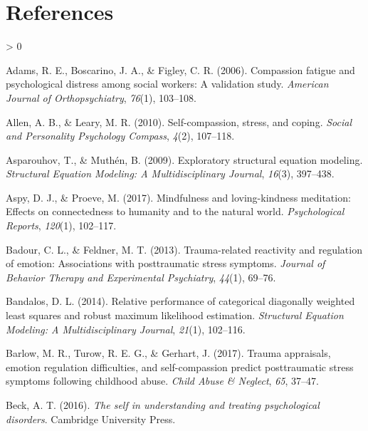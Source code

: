 \documentclass[
  english,
  man,floatsintext]{apa7}
\newlength{\cslhangindent}
\newenvironment{CSLReferences}[2] %
 {%
  \setlength{\parindent}{0pt}
  \ifodd #1 \everypar{\setlength{\hangindent}{\cslhangindent}}\ignorespaces\fi
  \ifnum #2 > 0
  \setlength{\parskip}{#2\baselineskip}
  \fi
 }%
 {}
\begin{document}
\newpage

\hypertarget{references}{%
\section{References}\label{references}}

\begingroup
\setlength{\parindent}{-0.5in}
\setlength{\leftskip}{0.5in}

\hypertarget{refs}{}
\begin{CSLReferences}{1}{0}
\leavevmode\hypertarget{ref-adams2006compassion}{}%
Adams, R. E., Boscarino, J. A., \& Figley, C. R. (2006). Compassion fatigue and psychological distress among social workers: A validation study. \emph{American Journal of Orthopsychiatry}, \emph{76}(1), 103--108.

\leavevmode\hypertarget{ref-allen2010self}{}%
Allen, A. B., \& Leary, M. R. (2010). Self-compassion, stress, and coping. \emph{Social and Personality Psychology Compass}, \emph{4}(2), 107--118.

\leavevmode\hypertarget{ref-asparouhov2009exploratory}{}%
Asparouhov, T., \& Muthén, B. (2009). Exploratory structural equation modeling. \emph{Structural Equation Modeling: A Multidisciplinary Journal}, \emph{16}(3), 397--438.

\leavevmode\hypertarget{ref-aspy2017mindfulness}{}%
Aspy, D. J., \& Proeve, M. (2017). Mindfulness and loving-kindness meditation: Effects on connectedness to humanity and to the natural world. \emph{Psychological Reports}, \emph{120}(1), 102--117.

\leavevmode\hypertarget{ref-badour2013trauma}{}%
Badour, C. L., \& Feldner, M. T. (2013). Trauma-related reactivity and regulation of emotion: Associations with posttraumatic stress symptoms. \emph{Journal of Behavior Therapy and Experimental Psychiatry}, \emph{44}(1), 69--76.

\leavevmode\hypertarget{ref-bandalos2014relative}{}%
Bandalos, D. L. (2014). Relative performance of categorical diagonally weighted least squares and robust maximum likelihood estimation. \emph{Structural Equation Modeling: A Multidisciplinary Journal}, \emph{21}(1), 102--116.

\leavevmode\hypertarget{ref-barlow2017trauma}{}%
Barlow, M. R., Turow, R. E. G., \& Gerhart, J. (2017). Trauma appraisals, emotion regulation difficulties, and self-compassion predict posttraumatic stress symptoms following childhood abuse. \emph{Child Abuse \& Neglect}, \emph{65}, 37--47.

\leavevmode\hypertarget{ref-beck2016self}{}%
Beck, A. T. (2016). \emph{The self in understanding and treating psychological disorders}. Cambridge University Press.


\end{CSLReferences}
\end{document}
